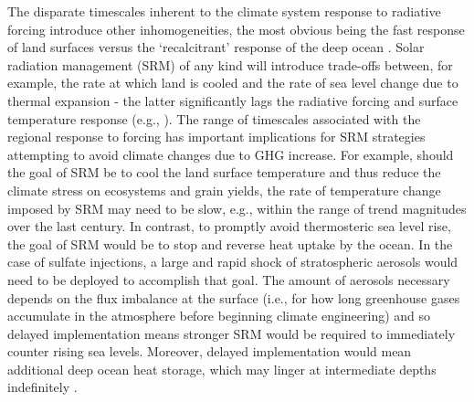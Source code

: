 \documentclass[grl]{AGUTeX}  %
\begin{document}
\begin{article}
The disparate timescales inherent to the climate system response to radiative forcing introduce other inhomogeneities, the most obvious being the fast response of land surfaces versus the `recalcitrant' response of the deep ocean \citep{held10}. Solar radiation management (SRM) of any kind will introduce trade-offs between, for example, the rate at which land is cooled and the rate of sea level change due to thermal expansion \citep{irvine12} - the latter significantly lags the radiative forcing and surface temperature response (e.g., \cite{wigley06,solomon10}). The range of timescales associated with the regional response to forcing has important implications for SRM strategies attempting to avoid climate changes due to GHG increase. For example, should the goal of SRM be to cool the land surface temperature and thus reduce the climate stress on ecosystems and grain yields, the rate of temperature change imposed by SRM may need to be slow, e.g., within the range of trend magnitudes over the last century. In contrast, to promptly avoid thermosteric sea level rise, the goal of SRM would be to stop and reverse heat uptake by the ocean. In the case of sulfate injections, a large and rapid shock of stratospheric aerosols would need to be deployed to accomplish that goal. The amount of aerosols necessary depends on the flux imbalance at the surface (i.e., for how long greenhouse gases accumulate in the atmosphere before beginning climate engineering) and so delayed implementation means stronger SRM would be required to immediately counter rising sea levels. Moreover, delayed implementation would mean additional deep ocean heat storage, which may linger at intermediate depths indefinitely \citep{gillett11}. %



\end{article}
\end{document}
